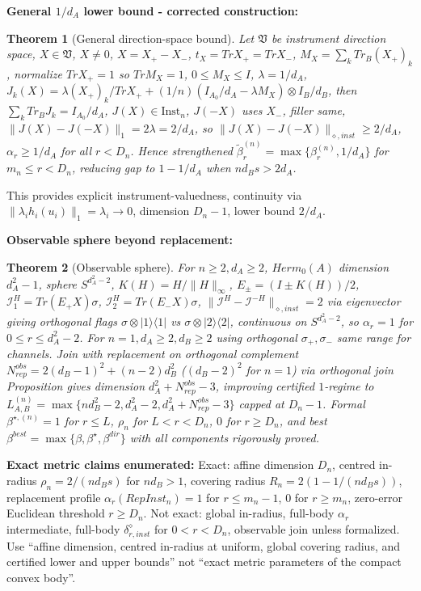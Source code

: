 \documentclass[11pt,a4paper]{article}
\newtheorem{theorem}{Theorem}[section]
\newcommand{\Inst}{\mathrm{Inst}}
\begin{document}
\textbf{General $1/d_A$ lower bound - corrected construction:}
\begin{theorem}[General direction-space bound]
Let $\mathfrak V$ be instrument direction space, $X\in\mathfrak V$, $X\ne0$, $X=X_+-X_-$, $t_X=Tr X_+=Tr X_-$, $M_X=\sum_kTr_B(X_+)_k$, normalize $Tr X_+=1$ so $Tr M_X=1$, $0\le M_X\le I$, $\lambda=1/d_A$, $J_k(X)=\lambda (X_+)_k/Tr X_+ + (1/n)(I_{A_0}/d_A-\lambda M_X)\otimes I_B/d_B$, then $\sum_kTr_BJ_k=I_{A_0}/d_A$, $J(X)\in\Inst_n$, $J(-X)$ uses $X_-$, filler same, $\|J(X)-J(-X)\|_1=2\lambda=2/d_A$, so $\|J(X)-J(-X)\|_{\diamond,inst}\ge2/d_A$, $\alpha_r\ge1/d_A$ for all $r<D_n$. Hence strengthened $\tilde\beta_r^{(n)}=\max\{\beta_r^{(n)},1/d_A\}$ for $m_n\le r<D_n$, reducing gap to $1-1/d_A$ when $nd_Bs>2d_A$.
\end{theorem}
This provides explicit instrument-valuedness, continuity via $\|\lambda_i h_i(u_i)\|_1=\lambda_i\to0$, dimension $D_n-1$, lower bound $2/d_A$.

\textbf{Observable sphere beyond replacement:}
\begin{theorem}[Observable sphere]
For $n\ge2,d_A\ge2$, $Herm_0(A)$ dimension $d_A^2-1$, sphere $S^{d_A^2-2}$, $K(H)=H/\|H\|_\infty$, $E_\pm=(I\pm K(H))/2$, $\mathcal I^H_1=Tr(E_+X)\sigma$, $\mathcal I^H_2=Tr(E_-X)\sigma$, $\|\mathcal I^H-\mathcal I^{-H}\|_{\diamond,inst}=2$ via eigenvector giving orthogonal flags $\sigma\otimes|1\rangle\langle1|$ vs $\sigma\otimes|2\rangle\langle2|$, continuous on $S^{d_A^2-2}$, so $\alpha_r=1$ for $0\le r\le d_A^2-2$. For $n=1,d_A\ge2,d_B\ge2$ using orthogonal $\sigma_+,\sigma_-$ same range for channels. Join with replacement on orthogonal complement $N_{rep}^{obs}=2(d_B-1)^2+(n-2)d_B^2$ ($(d_B-2)^2$ for $n=1$) via orthogonal join Proposition gives dimension $d_A^2+N_{rep}^{obs}-3$, improving certified $1$-regime to $L_{A,B}^{(n)}=\max\{nd_B^2-2,d_A^2-2,d_A^2+N_{rep}^{obs}-3\}$ capped at $D_n-1$. Formal $\beta^{\star,(n)}=1$ for $r\le L$, $\rho_n$ for $L<r<D_n$, $0$ for $r\ge D_n$, and best $\beta^{best}=\max\{\beta,\beta^\star,\beta^{dir}\}$ with all components rigorously proved.
\end{theorem}

\textbf{Exact metric claims enumerated:}
Exact: affine dimension $D_n$, centred in-radius $\rho_n=2/(nd_Bs)$ for $nd_B>1$, covering radius $R_n=2(1-1/(nd_Bs))$, replacement profile $\alpha_r(RepInst_n)=1$ for $r\le m_n-1$, $0$ for $r\ge m_n$, zero-error Euclidean threshold $r\ge D_n$. Not exact: global in-radius, full-body $\alpha_r$ intermediate, full-body $\delta_{r,inst}^\diamond$ for $0<r<D_n$, observable join unless formalized. Use ``affine dimension, centred in-radius at uniform, global covering radius, and certified lower and upper bounds'' not ``exact metric parameters of the compact convex body''.
\end{document}
